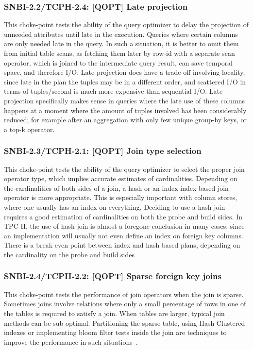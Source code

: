 \subsubsection{SNBI-2.2/TCPH-2.4: [QOPT]  Late projection}
\label{choke_point_2.2}
This choke-point tests the ability of the query optimizer to delay the projection of unneeded attributes until late in the execution. Queries where certain columns are only needed late in the query.
In such a situation, it is better to omit them from initial table scans, as fetching them later by row-id with a separate scan operator, which is joined to the intermediate query result, can save temporal space, and therefore I/O.
Late projection does have a trade-off involving locality, since late in the plan the tuples may be in a different order, and scattered I/O in terms of tuples/second is much more expensive than sequential I/O.
Late projection specifically makes sense in queries where the late use of these columns happens at a moment where the amount of tuples involved has been considerably reduced;
for example after an aggregation with only few unique group-by keys, or a top-k operator.

\subsubsection{SNBI-2.3/TCPH-2.1: [QOPT]  Join type selection}
\label{choke_point_2.3}
This choke-point tests the ability of the query optimizer to select the proper join operator type, which implies accurate estimates of cardinalities.
Depending on the cardinalities of both sides of a join, a hash or an index index based join operator is more appropriate.
This is especially important with column stores, where one usually has an index on everything. Deciding to use a hash join requires a good estimation of cardinalities on both the probe and build sides.
In TPC-H, the use of hash join is almost a foregone conclusion in many cases, since an implementation will usually not even define an index on foreign key columns.
There is a break even point between index and hash based plans, depending on the cardinality on the probe and build sides

\subsubsection{SNBI-2.4/TCPH-2.2: [QOPT]  Sparse foreign key joins}
\label{choke_point_2.4}
This choke-point tests the performance of join operators when the join is sparse. Sometimes joins involve relations where only a small percentage of rows in one of the tables is required to satisfy a join. When tables are larger, typical join methods can be sub-optimal. Partitioning the sparse table, using Hash Clustered indexes or implementing bloom filter tests inside the join are techniques to improve the performance in such situations~\cite{DBLP:journals/csur/Graefe93}.

